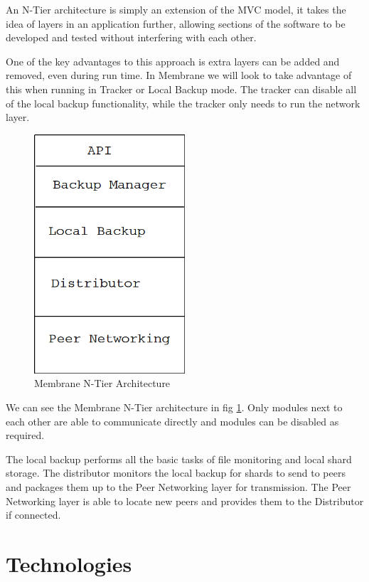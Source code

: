 \documentclass[11pt, a4paper, twocolumn, twoside]{report}
\begin{document}
An N-Tier architecture is simply an extension of the MVC model, it takes the idea of layers in an application further, allowing sections of the software to be developed and tested without interfering with each other.

One of the key advantages to this approach is extra layers can be added and removed, even during run time. In Membrane we will look to take advantage of this when running in Tracker or Local Backup mode. The tracker can disable all of the local backup functionality, while the tracker only needs to run the network layer.

\begin{figure}[b!]
 \includegraphics[width=0.5\textwidth]{membrane-n-tier}
 \caption{Membrane N-Tier Architecture}
 \label{fig:membrane-n-tier}
\end{figure}

We can see the Membrane N-Tier architecture in fig \ref{fig:membrane-n-tier}. Only modules next to each other are able to communicate directly and modules can be disabled as required.

The local backup performs all the basic tasks of file monitoring and local shard storage. The distributor monitors the local backup for shards to send to peers and packages them up to the Peer Networking layer for transmission. The Peer Networking layer is able to locate new peers and provides them to the Distributor if connected.

\section{Technologies}
\end{document}
